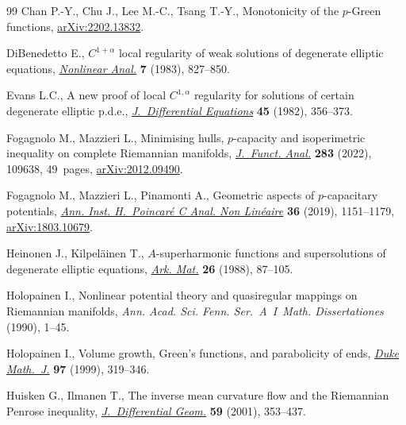 \documentclass[11pt]{article}
\numberwithin{equation}{section}
\numberwithin{equation}{section}
\begin{document}
\begin{thebibliography}{99}
Chan P.-Y., Chu J., Lee M.-C., Tsang T.-Y., Monotonicity of the $p$-{G}reen
 functions, \href{https://arxiv.org/abs/2202.13832}{arXiv:2202.13832}.

DiBenedetto E., {$C^{1+\alpha}$} local regularity of weak solutions of
 degenerate elliptic equations, \href{https://doi.org/10.1016/0362-546X(83)90061-5}{\textit{Nonlinear Anal.}} \textbf{7} (1983),
 827--850.

Evans L.C., A new proof of local {$C^{1,\alpha }$} regularity for solutions of
 certain degenerate elliptic p.d.e., \href{https://doi.org/10.1016/0022-0396(82)90033-X}{\textit{J.~Differential Equations}}
 \textbf{45} (1982), 356--373.

Fogagnolo M., Mazzieri L., Minimising hulls, {$p$}-capacity and isoperimetric
 inequality on complete {R}iemannian manifolds, \href{https://doi.org/10.1016/j.jfa.2022.109638}{\textit{J.~Funct. Anal.}}
 \textbf{283} (2022), 109638, 49~pages, \href{https://arxiv.org/abs/2012.09490}{arXiv:2012.09490}.

Fogagnolo M., Mazzieri L., Pinamonti A., Geometric aspects of {$p$}-capacitary
 potentials, \href{https://doi.org/10.1016/j.anihpc.2018.11.005}{\textit{Ann. Inst. H.~Poincar\'e C Anal. Non Lin\'eaire}}
 \textbf{36} (2019), 1151--1179, \href{https://arxiv.org/abs/1803.10679}{arXiv:1803.10679}.

Heinonen J., Kilpel\"ainen T., {$A$}-superharmonic functions and supersolutions
 of degenerate elliptic equations, \href{https://doi.org/10.1007/BF02386110}{\textit{Ark. Mat.}} \textbf{26} (1988),
 87--105.

Holopainen I., Nonlinear potential theory and quasiregular mappings on
 {R}iemannian manifolds, \textit{Ann. Acad. Sci. Fenn. Ser.~A~I~Math.
 Dissertationes} (1990), 1--45.

Holopainen I., Volume growth, {G}reen's functions, and parabolicity of ends,
 \href{https://doi.org/10.1215/S0012-7094-99-09714-4}{\textit{Duke Math.~J.}} \textbf{97} (1999), 319--346.

Huisken G., Ilmanen T., The inverse mean curvature flow and the {R}iemannian
 {P}enrose inequality, \href{https://doi.org/10.4310/jdg/1090349447}{\textit{J.~Differential Geom.}} \textbf{59} (2001),
 353--437.


\end{thebibliography}
\end{document}
